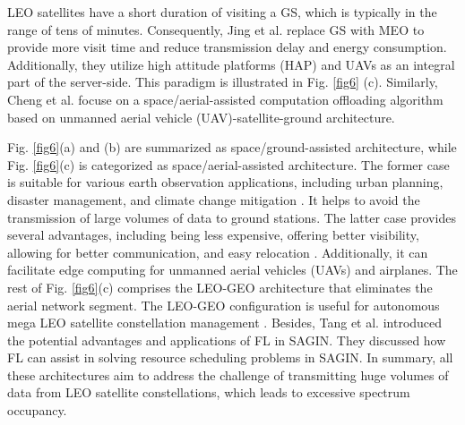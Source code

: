 \documentclass[lettersize,journal]{IEEEtran}
\begin{document}
LEO satellites have a short duration of visiting a GS, which is typically in the range of tens of minutes. Consequently, Jing et al. \cite{RN214} replace GS with MEO to provide more visit time and reduce transmission delay and energy consumption. Additionally, they utilize high attitude platforms (HAP) and UAVs as an integral part of the server-side. This paradigm is illustrated in Fig. \ref{fig6} (c). Similarly, Cheng et al. \cite{RN81} focuse on a space/aerial-assisted computation offloading algorithm based on unmanned aerial vehicle (UAV)-satellite-ground architecture.

Fig. \ref{fig6}(a) and (b) are summarized as space/ground-assisted architecture, while Fig. \ref{fig6}(c) is categorized as space/aerial-assisted architecture. The former case is suitable for various earth observation applications, including urban planning, disaster management, and climate change mitigation \cite{RN216}. It helps to avoid the transmission of large volumes of data to ground stations. The latter case provides several advantages, including being less expensive, offering better visibility, allowing for better communication, and easy relocation \cite{RN212}. Additionally, it can facilitate edge computing for unmanned aerial vehicles (UAVs) and airplanes. The rest of Fig. \ref{fig6}(c) comprises the LEO-GEO architecture that eliminates the aerial network segment. The LEO-GEO configuration is useful for autonomous mega LEO satellite constellation management \cite{RN217}. Besides, Tang et al. \cite{RN226} introduced the potential advantages and applications of FL in SAGIN. They discussed how FL can assist in solving resource scheduling problems in SAGIN. In summary, all these architectures aim to address the challenge of transmitting huge volumes of data from LEO satellite constellations, which leads to excessive spectrum occupancy.
\end{document}
